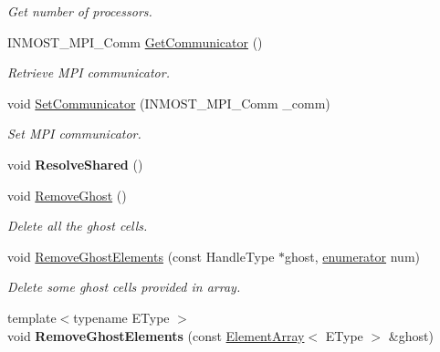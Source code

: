 \begin{DoxyCompactItemize}
\begin{DoxyCompactList}\small\item\em Get number of processors. \end{DoxyCompactList}\item 
\hypertarget{classINMOST_1_1Mesh_ae36b17a701ff34b531ebb81ca9c2a8cc}{I\-N\-M\-O\-S\-T\-\_\-\-M\-P\-I\-\_\-\-Comm \hyperlink{classINMOST_1_1Mesh_ae36b17a701ff34b531ebb81ca9c2a8cc}{Get\-Communicator} ()}\label{classINMOST_1_1Mesh_ae36b17a701ff34b531ebb81ca9c2a8cc}

\begin{DoxyCompactList}\small\item\em Retrieve M\-P\-I communicator. \end{DoxyCompactList}\item 
\hypertarget{classINMOST_1_1Mesh_ab60495d087cbd5c893c5322ba0fa2c69}{void \hyperlink{classINMOST_1_1Mesh_ab60495d087cbd5c893c5322ba0fa2c69}{Set\-Communicator} (I\-N\-M\-O\-S\-T\-\_\-\-M\-P\-I\-\_\-\-Comm \-\_\-comm)}\label{classINMOST_1_1Mesh_ab60495d087cbd5c893c5322ba0fa2c69}

\begin{DoxyCompactList}\small\item\em Set M\-P\-I communicator. \end{DoxyCompactList}\item 
\hypertarget{classINMOST_1_1Mesh_aafe1b9041308f0855c6be0e05973e660}{void {\bfseries Resolve\-Shared} ()}\label{classINMOST_1_1Mesh_aafe1b9041308f0855c6be0e05973e660}

\item 
\hypertarget{classINMOST_1_1Mesh_a904f35aec841e85367f6db64d8ce3cb8}{void \hyperlink{classINMOST_1_1Mesh_a904f35aec841e85367f6db64d8ce3cb8}{Remove\-Ghost} ()}\label{classINMOST_1_1Mesh_a904f35aec841e85367f6db64d8ce3cb8}

\begin{DoxyCompactList}\small\item\em Delete all the ghost cells. \end{DoxyCompactList}\item 
void \hyperlink{classINMOST_1_1Mesh_a5cb95f1e8d6b7987496fc8276c86cf3a}{Remove\-Ghost\-Elements} (const Handle\-Type $\ast$ghost, \hyperlink{classINMOST_1_1Storage_ae333dfced6fa9cfde0c8e7dcf1b0cc2b}{enumerator} num)
\begin{DoxyCompactList}\small\item\em Delete some ghost cells provided in array. \end{DoxyCompactList}\item 
\hypertarget{classINMOST_1_1Mesh_a0ac883e455fe795e9a7db3cc8c99ac26}{{\footnotesize template$<$typename E\-Type $>$ }\\void {\bfseries Remove\-Ghost\-Elements} (const \hyperlink{classINMOST_1_1ElementArray}{Element\-Array}$<$ E\-Type $>$ \&ghost)}\label{classINMOST_1_1Mesh_a0ac883e455fe795e9a7db3cc8c99ac26}


\end{DoxyCompactItemize}
